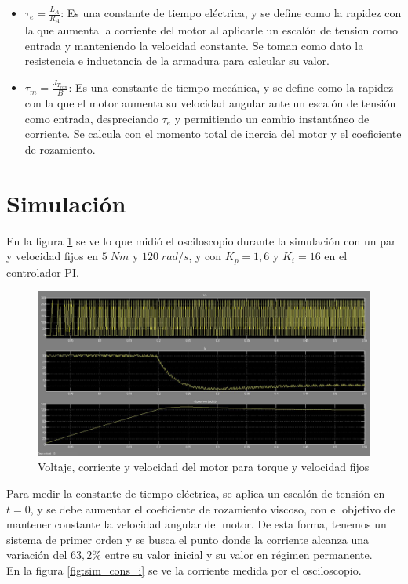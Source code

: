 \documentclass[11pt, a4paper]{article}
\begin{document}
\begin{itemize}
\item $\tau_e=\frac{L_A}{R_A}$:  Es una constante de tiempo eléctrica, y se define como la rapidez con la que aumenta la corriente del motor al aplicarle un escalón de tension como entrada y manteniendo la velocidad constante. Se toman como dato la resistencia e inductancia de la armadura para calcular su valor.
\item $\tau_m=\frac{J_{T_{rem}}}{B}$: Es una constante de tiempo mecánica, y se define como la rapidez con la que el motor aumenta su velocidad angular ante un escalón de tensión como entrada, despreciando $\tau_e$ y permitiendo un cambio instantáneo de corriente. Se calcula con el momento total de inercia del motor y el coeficiente de rozamiento.
\end{itemize}

\section{Simulación}
En la figura \ref{fig:sim_cons} se ve lo que midió el osciloscopio durante la simulación con un par y velocidad fijos en $5\;Nm$ y $120\;rad/s$, y con $K_p=1,6$ y $K_i=16$ en el controlador PI.

\begin{figure}[H]
 \centering
 \includegraphics[scale=0.4]{imagenes/sim_cons.jpg}
 \caption{Voltaje, corriente y velocidad del motor para torque y velocidad fijos}
 \label{fig:sim_cons}
\end{figure}

Para medir la constante de tiempo eléctrica, se aplica un escalón de tensión en $t=0$, y se debe aumentar el coeficiente de rozamiento viscoso, con el objetivo de mantener constante la velocidad angular del motor. De esta forma, tenemos un sistema de primer orden y se busca el punto donde la corriente alcanza una variación del $63,2\%$ entre su valor inicial y su valor en régimen permanente.\\
En la figura \ref{fig:sim_cons_i} se ve la corriente medida por el osciloscopio.
\end{document}
